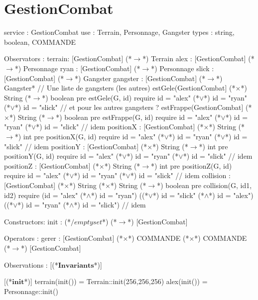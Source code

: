 \documentclass[a4paper, 11pt]{report}
\newcommand{\specB}[1]{\textbf{#1}}
\begin{document}
\section{GestionCombat}
\begin{Spe}
service : GestionCombat
use : Terrain, Personnage, Gangster  
types : string, boolean, COMMANDE

Observators :
      terrain: [GestionCombat] (*$\rightarrow$*) Terrain
      alex : [GestionCombat] (*$\rightarrow$*) Personnage
      ryan : [GestionCombat] (*$\rightarrow$*) Personnage
      slick : [GestionCombat] (*$\rightarrow$*) Gangster 
      gangster :  [GestionCombat] (*$\rightarrow$*) {Gangster*} // Une liste de gangsters (les autres) 
      estGele(GestionCombat] (*$\times$*) String (*$\rightarrow$*) boolean 
            pre estGele(G, id) require id = "alex" (*$\lor$*) id = "ryan" (*$\lor$*) id = "slick" // et pour les autres gangsters ?  
      estFrappe(GestionCombat] (*$\times$*) String (*$\rightarrow$*) boolean 
            pre estFrappe(G, id) require id = "alex" (*$\lor$*) id = "ryan" (*$\lor$*) id = "slick" // idem 
      positionX : [GestionCombat] (*$\times$*) String (*$\rightarrow$*) int
            pre positionX(G, id) require id = "alex" (*$\lor$*) id = "ryan" (*$\lor$*) id = "slick" // idem 
      positionY :  [GestionCombat] (*$\times$*) String (*$\rightarrow$*) int 
            pre positionY(G, id) require id = "alex" (*$\lor$*) id = "ryan" (*$\lor$*) id = "slick" // idem 
      positionZ :   [GestionCombat] (*$\times$*) String (*$\rightarrow$*) int
            pre positionZ(G, id) require id = "alex" (*$\lor$*) id = "ryan" (*$\lor$*) id = "slick" // idem  
      collision : [GestionCombat] (*$\times$*) String (*$\times$*) String (*$\rightarrow$*) boolean
            pre collision(G, id1, id2) require (id = "alex" (*$\land$*) id = "ryan")
            ((*$\lor$*) id = "slick" (*$\land$*) id = "alex") 
            ((*$\lor$*) id = "ryan"
            (*$\land$*) id = "slick") // idem 

      Constructors:
      init : (*$/emptyset$*) (*$\rightarrow$*) [GestionCombat]
      
Operators :
      gerer : [GestionCombat] (*$\times$*) COMMANDE (*$\times$*) COMMANDE (*$\rightarrow$*) [GestionCombat]

Observations : 
      [(*$\specB{Invariants}$*)]
            
      [(*$\specB{init}$*)]
            terrain(init()) = Terrain::init(256,256,256)
            alex(init()) = Personnage::init()

\end{Spe}
\end{document}
